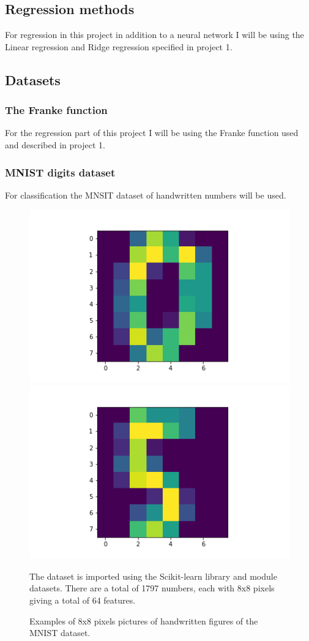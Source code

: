 \documentclass[reprint,english,notitlepage]{revtex4-2}  %
\begin{document}
\subsection{Regression methods}
For regression in this project in addition to a neural network I will be using the Linear regression and Ridge regression specified in project 1. 

\subsection{Datasets}
\subsubsection{The Franke function}
For the regression part of this project I will be using the Franke function used and described in project 1. 

\subsubsection{MNIST digits dataset}
For classification the MNSIT dataset of handwritten numbers will be used. 
\begin{figure}[!htb]
	\includegraphics[trim=140 20 0 0, scale=0.4]{MNIST figure 1}
	\includegraphics[trim=140 20 0 0, scale=0.4]{MNIST figure 2}
	\caption{Examples of 8x8 pixels pictures of handwritten figures of the MNIST dataset.}\label{figure}
	
The dataset is imported using the Scikit-learn library and module datasets.
There are a total of 1797 numbers, each with 8x8 pixels giving a total of 64 features.  
\end{figure}
\end{document}
